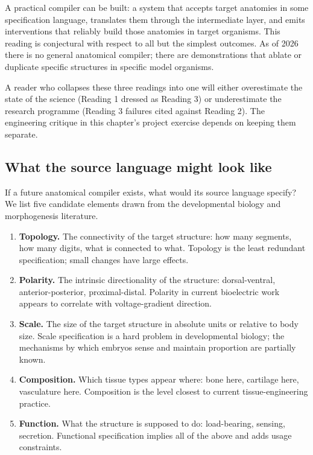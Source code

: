 A practical compiler can be
built: a system that accepts target anatomies in some specification
language, translates them through the intermediate layer, and emits
interventions that reliably build those anatomies in target organisms.
This reading is conjectural with respect to all but the simplest
outcomes. As of 2026 there is no general anatomical compiler; there
are demonstrations that ablate or duplicate specific structures in
specific model organisms.

A reader who collapses these three readings into one will either
overestimate the state of the science (Reading 1 dressed as Reading 3)
or underestimate the research programme (Reading 3 failures cited
against Reading 2). The engineering critique in this chapter's project
exercise depends on keeping them separate.

\subsection{What the source language might look like}

If a future anatomical compiler exists, what would its source language
specify? We list five candidate elements drawn from the developmental
biology and morphogenesis literature.

\begin{enumerate}[leftmargin=*]
\item \textbf{Topology.} The connectivity of the target structure: how
many segments, how many digits, what is connected to what. Topology
is the least redundant specification; small changes have large
effects.
\item \textbf{Polarity.} The intrinsic directionality of the structure:
dorsal-ventral, anterior-posterior, proximal-distal. Polarity in
current bioelectric work appears to correlate with voltage-gradient
direction.
\item \textbf{Scale.} The size of the target structure in absolute
units or relative to body size. Scale specification is a hard problem
in developmental biology; the mechanisms by which embryos sense and
maintain proportion are partially known.
\item \textbf{Composition.} Which tissue types appear where: bone here,
cartilage here, vasculature here. Composition is the level closest to
current tissue-engineering practice.
\item \textbf{Function.} What the structure is supposed to do:
load-bearing, sensing, secretion. Functional specification implies
all of the above and adds usage constraints.
\end{enumerate}

